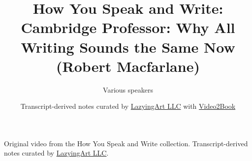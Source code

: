 \documentclass[11pt,oneside]{book}
\begin{document}
\frontmatter
\title{How You Speak and Write: Cambridge Professor: Why All Writing Sounds the Same Now (Robert Macfarlane)}
\author{Various speakers}
\date{Transcript-derived notes curated by \href{https://lazying.art}{LazyingArt LLC} with \href{https://github.com/lachlanchen/Video2Book}{Video2Book}}
\maketitle
\begin{center}
\small Original video from the How You Speak and Write collection. Transcript-derived notes curated by \href{https://lazying.art}{LazyingArt LLC}.
\end{center}
\clearpage
\mainmatter

\end{document}
